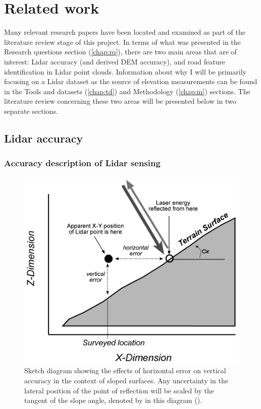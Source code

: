 
\chapter{Related work}
\label{chap:rw}

Many relevant research papers have been located and examined as part of the literature review stage of this project. In terms of what was presented in the Research questions section (\ref{chap:rq}), there are two main areas that are of interest: Lidar accuracy (and derived DEM accuracy), and road feature identification in Lidar point clouds. Information about why I will be primarily focusing on a Lidar dataset as the source of elevation measurements can be found in the Tools and datasets (\ref{chap:td}) and Methodology (\ref{chap:m}) sections. The literature review concerning these two areas will be presented below in two separate sections.

\section*{Lidar accuracy}
\label{section:lidaraccuracy}
\subsection*{Accuracy description of Lidar sensing}
\label{subsection:lidarsensingaccuracy}

\begin{figure}
    \includegraphics[width=0.95\linewidth]{p2/figs/hodgson_breshanan_2004_01.png} 
    \caption{Sketch diagram showing the effects of horizontal error on vertical accuracy in the context of sloped surfaces. Any uncertainty in the lateral position of the point of reflection will be scaled by the tangent of the slope angle, denoted by \alpha in this diagram (\cite{hodgson_breshanan_2004}).}
    \label{fig:elevationaccuracy}
\end{figure}

